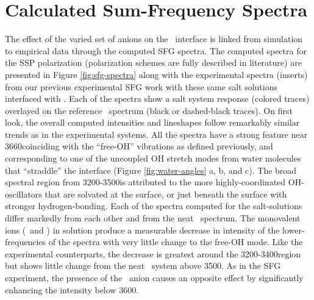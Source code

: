 \section{Calculated Sum-Frequency Spectra}

The effect of the varied set of anions on the \ctcwat~interface is linked from simulation to empirical data through the computed SFG spectra. The computed spectra for the SSP polarization (polarization schemes are fully described in literature\cite{Lambert2005}) are presented in Figure \ref{fig:sfg-spectra} along with the experimental spectra (inserts) from our previous experimental SFG work with these same salt solutions interfaced with \ctc.\cite{McFearin2009} Each of the spectra show a salt system response (colored traces) overlayed on the reference \ctcwat~spectrum (black or dashed-black traces). On first look, the overall computed intensities and lineshapes follow remarkably similar trends as in the experimental systems. All the spectra have a strong feature near 3660\cm coinciding with the ``free-OH'' vibrations as defined previously,\cite{McFearin2009} and corresponding to one of the uncoupled OH stretch modes from water molecules that ``straddle'' the interface (Figure \ref{fig:water-angles} a, b, and c).\cite{McFearin2009} The broad spectral region from 3200-3500\cm is attributed to the more highly-coordinated OH-oscillators that are solvated at the surface, or just beneath the surface with stronger hydrogen-bonding. Each of the spectra computed for the salt-solutions differ markedly from each other and from the neat \ctcwat~spectrum. The monovalent ions (\cl~and \nit) in solution produce a measurable decrease in intensity of the lower-frequencies of the spectra with very little change to the free-OH mode. Like the experimental counterparts, the decrease is greatest around the 3200-3400\cm region but shows little change from the neat \ctcwat~system above 3500\cm. As in the SFG experiment, the presence of the \sul~anion causes an opposite effect by significantly enhancing the intensity below 3600\cm.

